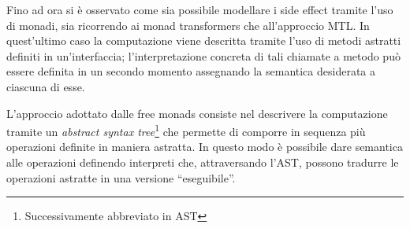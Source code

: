 Fino ad ora si è osservato come sia possibile modellare i side effect tramite l'uso di monadi, sia ricorrendo ai monad transformers che all'approccio MTL. In quest'ultimo caso la computazione viene descritta tramite l'uso di metodi astratti definiti in un'interfaccia; l'interpretazione concreta di tali chiamate a metodo può essere definita in un secondo momento assegnando la semantica desiderata a ciascuna di esse.

L'approccio adottato dalle free monads consiste nel descrivere la computazione tramite un \emph{abstract syntax tree}\footnote{Successivamente abbreviato in AST} che permette di comporre in sequenza più operazioni definite in maniera astratta. In questo modo è possibile dare semantica alle operazioni definendo interpreti che, attraversando l'AST, possono tradurre le operazioni astratte in una versione ``eseguibile''.
